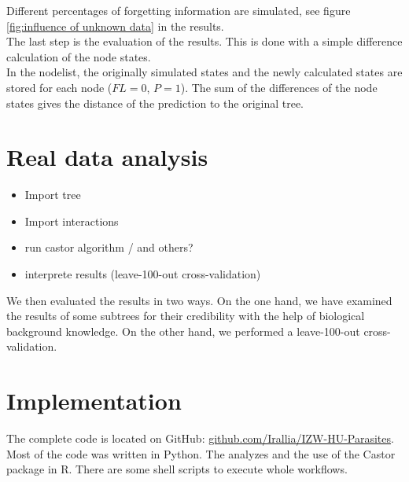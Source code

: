     Different percentages of forgetting information are simulated, see figure 
      \ref{fig:influence of unknown data} in the results. \\
  
    The last step is the evaluation of the results. This is done with a simple difference calculation 
      of the node states. \\
    In the nodelist, the originally simulated states and the newly calculated states are stored for 
      each node ($FL = 0$, $P = 1$). The sum of the differences of the node states gives the distance 
      of the prediction to the original tree.

  \section{Real data analysis}
    \begin{itemize}
      \item Import tree
      \item Import interactions
      \item run castor algorithm / and others?
      \item interprete results (leave-100-out cross-validation)
    \end{itemize}
    We then evaluated the results in two ways. On the one hand, we have examined the results of some 
      subtrees for their credibility with the help of biological background knowledge. On the other 
      hand, we performed a leave-100-out cross-validation.

  \section{Implementation}
    The complete code is located on GitHub: 
      \hyperlink{github.com/Irallia/IZW-HU-Parasites}{github.com/Irallia/IZW-HU-Parasites}. \\
    Most of the code was written in Python. The analyzes and the use of the Castor package in R. There 
      are some shell scripts to execute whole workflows.

